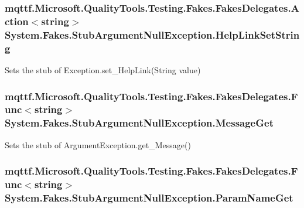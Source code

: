 \hypertarget{class_system_1_1_fakes_1_1_stub_argument_null_exception_a55758bbf91de4951aea14b992d540afa}{
\subsubsection[{Help\-Link\-Set\-String}]{\setlength{\rightskip}{0pt plus 5cm}mqttf.\-Microsoft.\-Quality\-Tools.\-Testing.\-Fakes.\-Fakes\-Delegates.\-Action$<$string$>$ System.\-Fakes.\-Stub\-Argument\-Null\-Exception.\-Help\-Link\-Set\-String}}\label{class_system_1_1_fakes_1_1_stub_argument_null_exception_a55758bbf91de4951aea14b992d540afa}


Sets the stub of Exception.\-set\-\_\-\-Help\-Link(\-String value)

\hypertarget{class_system_1_1_fakes_1_1_stub_argument_null_exception_af37da77bf8dd059bf9487303cf3eed8d}{
\subsubsection[{Message\-Get}]{\setlength{\rightskip}{0pt plus 5cm}mqttf.\-Microsoft.\-Quality\-Tools.\-Testing.\-Fakes.\-Fakes\-Delegates.\-Func$<$string$>$ System.\-Fakes.\-Stub\-Argument\-Null\-Exception.\-Message\-Get}}\label{class_system_1_1_fakes_1_1_stub_argument_null_exception_af37da77bf8dd059bf9487303cf3eed8d}


Sets the stub of Argument\-Exception.\-get\-\_\-\-Message()

\hypertarget{class_system_1_1_fakes_1_1_stub_argument_null_exception_aa1d9eefa4a567769bafa72975f5feee3}{
\subsubsection[{Param\-Name\-Get}]{\setlength{\rightskip}{0pt plus 5cm}mqttf.\-Microsoft.\-Quality\-Tools.\-Testing.\-Fakes.\-Fakes\-Delegates.\-Func$<$string$>$ System.\-Fakes.\-Stub\-Argument\-Null\-Exception.\-Param\-Name\-Get}}\label{class_system_1_1_fakes_1_1_stub_argument_null_exception_aa1d9eefa4a567769bafa72975f5feee3}


